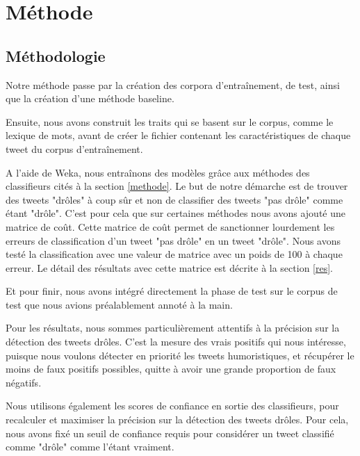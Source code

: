 \documentclass[10pt,a4paper,twoside]{article}
\begin{document}
\section{Méthode}
\label{methClass}

\subsection{Méthodologie}
Notre méthode passe par la création des corpora d'entraînement, de test, ainsi que la création d'une méthode baseline.

Ensuite, nous avons construit les traits qui se basent sur le corpus, comme le lexique de mots, avant de créer le fichier contenant les caractéristiques de chaque tweet du corpus d'entraînement.

A l'aide de Weka, nous entraînons des modèles grâce aux méthodes des classifieurs cités à la section \ref{methode}. Le but de notre démarche est de trouver des tweets "drôles" à coup sûr et non de classifier des tweets "pas drôle" comme étant "drôle". C'est pour cela que sur certaines méthodes nous avons ajouté une matrice de coût. Cette matrice de coût permet de sanctionner lourdement les erreurs de classification d'un tweet "pas drôle" en un tweet "drôle". Nous avons testé la classification avec une valeur de matrice avec un poids de 100 à chaque erreur. Le détail des résultats avec cette matrice est décrite à la section \ref{res}.

Et pour finir, nous avons intégré directement la phase de test sur le corpus de test que nous avions préalablement annoté à la main.

Pour les résultats, nous sommes particulièrement attentifs à la précision sur la détection des tweets drôles. C'est la mesure des vrais positifs qui nous intéresse, puisque nous voulons détecter en priorité les tweets humoristiques, et récupérer le moins de faux positifs possibles, quitte à avoir une grande proportion de faux négatifs.

Nous utilisons également les scores de confiance en sortie des classifieurs, pour recalculer et maximiser la précision sur la détection des tweets drôles. Pour cela, nous avons fixé un seuil de confiance requis pour considérer un tweet classifié comme "drôle" comme l'étant vraiment. 
\end{document}
